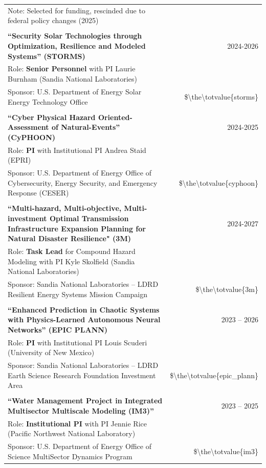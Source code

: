 \documentclass{article}[12pt]
\begin{document}
\begin{tabularx}{\textwidth}{Xr}
			Note: Selected for funding, rescinded due to federal policy changes (2025)%
			\\
			\\
			\textbf{``Security Solar Technologies through Optimization, Resilience and Modeled Systems'' (STORMS)} & 2024-2026 \\
			Role: \textbf{Senior Personnel} with PI Laurie Burnham (Sandia National Laboratories) & \\
			Sponsor: U.S. Department of Energy Solar Energy Technology Office & \$\num{\the\totvalue{storms}} %
			\\
			\\
			\textbf{``Cyber Physical Hazard Oriented-Assessment of Natural-Events'' (CyPHOON)} & 2024-2025 \\
			Role: \textbf{PI} with Institutional PI Andrea Staid (EPRI) & \\ 
			Sponsor: U.S. Department of Energy Office of Cybersecurity, Energy Security, and Emergency Response (CESER) & \$\num{\the\totvalue{cyphoon}} 
			\\
			\\
			\textbf{``Multi-hazard, Multi-objective, Multi-investment Optimal Transmission Infrastructure Expansion Planning for Natural Disaster Resilience" (3M)} & 2024-2027 \\
			Role:  \textbf{Task Lead} for Compound Hazard Modeling with PI Kyle Skolfield (Sandia National Laboratories) & \\
			Sponsor: Sandia National Laboratories -- LDRD Resilient Energy Systems Mission Campaign &  \$\num{\the\totvalue{3m}}  
			\\
			\\
			\textbf{``Enhanced Prediction in Chaotic Systems with Physics-Learned Autonomous Neural Networks'' (EPIC PLANN)} & 2023 -- 2026 \\
			Role: \textbf{PI} with Institutional PI Louis Scuderi (University of New Mexico) & \\ 
			Sponsor: Sandia National Laboratories -- LDRD Earth Science Research Foundation Investment Area & \$\num{\the\totvalue{epic_plann}} 
			\\
			\\
			\textbf{``Water Management Project in Integrated Multisector Multiscale Modeling (IM3)''} & 2023 -- 2025 \\
			Role: \textbf{Institutional PI} with PI Jennie Rice (Pacific Northwest National Laboratory) & \\
			Sponsor: U.S. Department of Energy Office of Science MultiSector Dynamics Program & \$\num{\the\totvalue{im3}} 

\end{tabularx}
\end{document}
